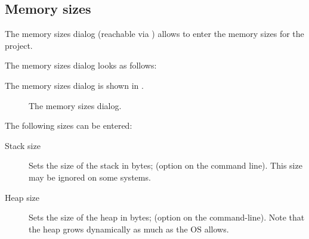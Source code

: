 \subsection{Memory sizes}
The memory sizes dialog (reachable via ) allows 
to enter the memory sizes for the project.
\begin{htmlonly}
The memory sizes dialog looks as follows:
\end{htmlonly}
\begin{latexonly}
The memory sizes dialog is shown in .
\begin{figure}[ht]
\begin{center}
\caption{The memory sizes dialog.}\label{fig:omemsize}
\ifpdf
{}
\else
{}
\fi
\end{center}
\end{figure}
\end{latexonly}
The following sizes can be entered:
\begin{description}
\item[Stack size] Sets the size of the stack in bytes; 
(option  on the command line). This size may be ignored on some
systems.
\item[Heap size] Sets the size of the heap in bytes; (option  on
the command-line). Note that the heap grows dynamically as much as the OS
allows.
\end{description}

%
%
